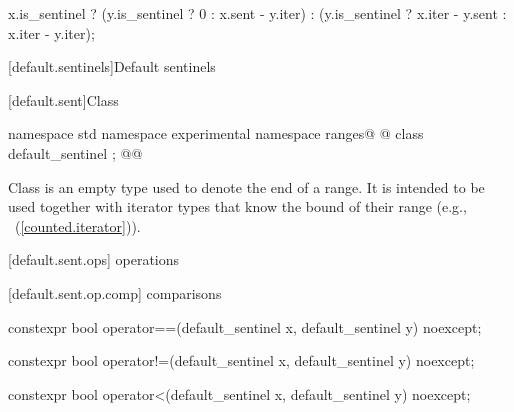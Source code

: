 \begin{addedblock}
\begin{itemdescr}
\pnum
{}
\begin{codeblock}
x.is_sentinel ?
    (y.is_sentinel ? 0 : x.sent - y.iter) :
    (y.is_sentinel ?
         x.iter - y.sent :
         x.iter - y.iter);
\end{codeblock}
\end{itemdescr}

[default.sentinels]{Default sentinels}

[default.sent]{Class }

%
\begin{itemdecl}
namespace std { namespace experimental { namespace ranges@ @ {
  class default_sentinel { };
}}}@\newtxt{\}}@
\end{itemdecl}

\pnum
Class  is an empty type used to denote the end of a
range. It is intended to be used together with iterator types that know the bound
of their range (e.g., ~(\ref{counted.iterator})).

{\color{oldclr}
[default.sent.ops]{ operations}

[default.sent.op.comp]{ comparisons}

%
%
\begin{itemdecl}
constexpr bool operator==(default_sentinel x, default_sentinel y) noexcept;
\end{itemdecl}

\begin{itemdescr}
\pnum
\returns {}
\end{itemdescr}

%
%
\begin{itemdecl}
constexpr bool operator!=(default_sentinel x, default_sentinel y) noexcept;
\end{itemdecl}

\begin{itemdescr}
\pnum
\returns {}
\end{itemdescr}

%
%
\begin{itemdecl}
constexpr bool operator<(default_sentinel x, default_sentinel y) noexcept;
\end{itemdecl}

}
\end{addedblock}
